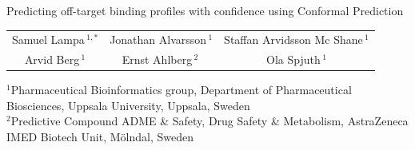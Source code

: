 \documentclass[10pt,article]{memoir}
\begin{document}
\begin{center}
{\LARGE\noindent Predicting off-target binding profiles with confidence using Conformal Prediction}
\end{center}

\begin{center}
\noindent
\begin{tabular}{ccc}
Samuel Lampa\,$^{1,*}$  & Jonathan Alvarsson\,$^{1}$ &  Staffan Arvidsson Mc Shane\,$^{1}$ \\
 Arvid Berg\,$^{1}$ &Ernst Ahlberg\,$^{2}$\, & Ola Spjuth\,$^{1}$ \\
\end{tabular}
\end{center}

\noindent
\begin{minipage}{1.1\textwidth}
\noindent\footnotesize $^1$Pharmaceutical Bioinformatics group, Department of Pharmaceutical Biosciences, Uppsala University, Uppsala, Sweden \\ 
\noindent\footnotesize $^2$Predictive Compound ADME \& Safety, Drug Safety \& Metabolism, AstraZeneca IMED Biotech Unit, Mölndal, Sweden \\ 
\end{minipage}


\def\keyFont{\fontsize{8}{11}\helveticabold}
\def\firstAuthorLast{Lampa {et~al.}} %
\def\Authors{Samuel Lampa\,$^{1,*}$, Jonathan Alvarsson\,$^{1}$, Staffan Arvidsson Mc Shane\,$^{1}$, Arvid Berg\,$^{1}$, Ernst Ahlberg\,$^{2}$  and Ola Spjuth\,$^{1}$}
\def\Address{$^{1}$Pharmaceutical Bioinformatics group, Department of Pharmaceutical Biosciences, Uppsala University, Uppsala, Sweden\\
$^{2}$Predictive Compound ADME \& Safety, Drug Safety \& Metabolism, AstraZeneca IMED Biotech Unit, M"olndal, Sweden}
\def\corrAuthor{Corresponding Author}

\def\corrEmail{samuel.lampa@farmbio.uu.se}
\end{document}
